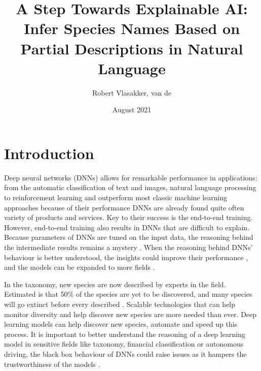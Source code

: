 \documentclass{article}
\title{A Step Towards Explainable AI: Infer Species Names Based on Partial Descriptions in Natural Language}
\author{Robert Vlasakker, van de}
\date{August 2021}
\begin{document}
\graphicspath{ {./figures/} }

\maketitle

\section{Introduction}
Deep neural networks (DNNs) allows for remarkable performance in applications: from the automatic classification of text and images, natural language processing to reinforcement learning and outperform most classic machine learning approaches \autocite{he_delving_2015, brown_language_2020}
because of their performance DNNs are already found quite often variety of products and services.
Key to their success is the end-to-end training.
However, end-to-end training also results in DNNs that are difficult to explain.
Because parameters of DNNs are tuned on the input data, the reasoning behind the intermediate results remains a mystery \autocite{li_interpretable_2021, losch_interpretability_2019}.
When the reasoning behind DNNs' behaviour is better understood, the insights could improve their performance \autocite{amershi_modeltracker_2015}, and the models can be expanded to more fields \autocite{lei_opening_2018}.

In the taxonomy, new species are now described by experts in the field.
Estimated is that 50\% of the species are yet to be discovered, and many species will go extinct before every described \autocite{lees_species_2015}.
Scalable technologies that can help monitor diversity and help discover new species are more needed than ever.
Deep learning models can help discover new species, automate and speed up this process.
It is important to better understand the reasoning of a deep learning model in sensitive fields like taxonomy, financial classification or autonomous driving, the black box behaviour of DNNs could raise issues as it hampers the trustworthiness of the models \autocite{carvalho_machine_2019}.
\end{document}
